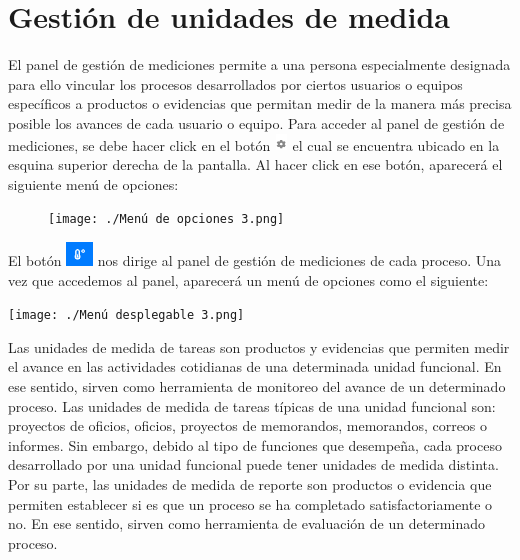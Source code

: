 \documentclass[
  letterpaper,
  DIV=11,
  numbers=noendperiod]{scrreprt}
\begin{document}
\hypertarget{gestiuxf3n-de-unidades-de-medida}{%
\section{Gestión de unidades de
medida}\label{gestiuxf3n-de-unidades-de-medida}}

El panel de gestión de mediciones permite a una persona especialmente
designada para ello vincular los procesos desarrollados por ciertos
usuarios o equipos específicos a productos o evidencias que permitan
medir de la manera más precisa posible los avances de cada usuario o
equipo. Para acceder al panel de gestión de mediciones, se debe hacer
click en el botón
\includegraphics[width=0.13542in,height=0.17708in]{./img/manual-admin/Tuerca.png}
el cual se encuentra ubicado en la esquina superior derecha de la
pantalla. Al hacer click en ese botón, aparecerá el siguiente menú de
opciones:

\begin{figure}

{\centering \texttt{[image: ./Menú de opciones 3.png]}

}

\end{figure}

El botón
\includegraphics[width=0.28125in,height=0.25in]{./Botón de gestión de mediciones.png}
nos dirige al panel de gestión de mediciones de cada proceso. Una vez
que accedemos al panel, aparecerá un menú de opciones como el siguiente:

\texttt{[image: ./Menú desplegable 3.png]}

Las unidades de medida de tareas son productos y evidencias que permiten
medir el avance en las actividades cotidianas de una determinada unidad
funcional. En ese sentido, sirven como herramienta de monitoreo del
avance de un determinado proceso. Las unidades de medida de tareas
típicas de una unidad funcional son: proyectos de oficios, oficios,
proyectos de memorandos, memorandos, correos o informes. Sin embargo,
debido al tipo de funciones que desempeña, cada proceso desarrollado por
una unidad funcional puede tener unidades de medida distinta. Por su
parte, las unidades de medida de reporte son productos o evidencia que
permiten establecer si es que un proceso se ha completado
satisfactoriamente o no. En ese sentido, sirven como herramienta de
evaluación de un determinado proceso.
\end{document}

